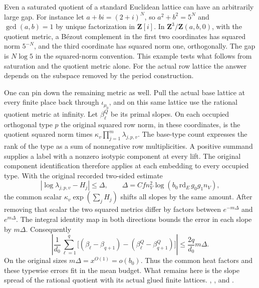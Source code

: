 Even a saturated quotient of a standard Euclidean lattice can
have an arbitrarily large gap. For instance let
\(a+bi=(2+i)^N\), so \(a^2+b^2=5^N\) and \(\gcd(a,b)=1\)
by unique factorization in \(\mathbf Z[i]\). In
\(\mathbf Z^3/\mathbf Z(a,b,0)\), with the quotient metric, a
Bézout complement in the first two coordinates has squared norm
\(5^{-N}\), and the third coordinate has squared norm one,
orthogonally. The gap is \(N\log 5\) in the squared-norm
convention. This example tests what follows from saturation and
the quotient metric alone. For the actual row lattice the answer
depends on the subspace removed by the period construction.

One can pin down the remaining metric as well. Pull the actual
base lattice at every finite place back through \(\iota_{\mu_0}\),
and on this same lattice use the rational quotient metric at
infinity. Let \(\beta^Q_\ell\) be its primal slopes. On each
occupied orthogonal type \(p\) the original squared row norm,
in these coordinates, is the quotient squared norm times
\(\kappa_v\prod_{j=1}^{m}\lambda_{j,p,v}\).
The base-type count expresses the rank of the type as a sum of
nonnegative row multiplicities. A positive summand supplies a
label with a nonzero isotypic component at every lift. The
original component identification therefore applies at each
embedding to every occupied type. With the original recorded
two-sided estimate
\[
 |\log\lambda_{j,p,v}-H_j|\le\Delta,\qquad
 \Delta=C f n_V^2\log(b_0\,\mathrm{rd}_E\,g_0g_1 n_V),
\]
the common scalar \(\kappa_v\exp(\sum_jH_j)\) shifts all slopes
by the same amount. After removing that scalar the two squared
metrics differ by factors between \(e^{-m\Delta}\) and
\(e^{m\Delta}\). The integral identity map in both directions
bounds the error in each slope by \(m\Delta\). Consequently
\[
 \left|\frac{1}{d_0}\sum_{\ell=1}^{q}
  \big[(\beta_\ell-\beta_{q+1})
         -(\beta^Q_\ell-\beta^Q_{q+1})\big]\right|
    \le \frac{2q}{d_0}m\Delta .
\]
On the original sizes \(m\Delta=x^{O(1)}=o(b_0)\).
Thus the common heat factors and these typewise errors fit in
the mean budget. What remains here is the slope spread of the
rational quotient with its actual glued finite lattices.
,
,
 and
.
